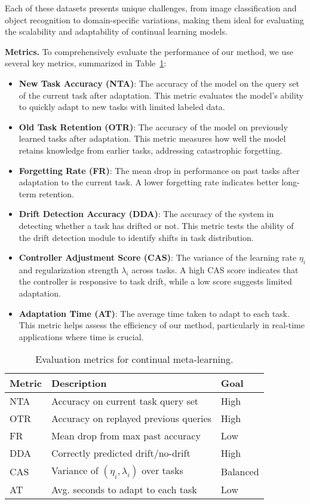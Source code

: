 \documentclass[conference]{IEEEtran}
\begin{document}
Each of these datasets presents unique challenges, from image classification and object recognition to domain-specific variations, making them ideal for evaluating the scalability and adaptability of continual learning models.

\textbf{Metrics.}  
To comprehensively evaluate the performance of our method, we use several key metrics, summarized in Table~\ref{tab:evaluation_matrix}:

\begin{itemize}
    \item \textbf{New Task Accuracy (NTA)}: The accuracy of the model on the query set of the current task after adaptation. This metric evaluates the model's ability to quickly adapt to new tasks with limited labeled data.
    \item \textbf{Old Task Retention (OTR)}: The accuracy of the model on previously learned tasks after adaptation. This metric measures how well the model retains knowledge from earlier tasks, addressing catastrophic forgetting.
    \item \textbf{Forgetting Rate (FR)}: The mean drop in performance on past tasks after adaptation to the current task. A lower forgetting rate indicates better long-term retention.
    \item \textbf{Drift Detection Accuracy (DDA)}: The accuracy of the system in detecting whether a task has drifted or not. This metric tests the ability of the drift detection module to identify shifts in task distribution.
    \item \textbf{Controller Adjustment Score (CAS)}: The variance of the learning rate $\eta_i$ and regularization strength $\lambda_i$ across tasks. A high CAS score indicates that the controller is responsive to task drift, while a low score suggests limited adaptation.
    \item \textbf{Adaptation Time (AT)}: The average time taken to adapt to each task. This metric helps assess the efficiency of our method, particularly in real-time applications where time is crucial.
\end{itemize}

\begin{table}[ht]
\centering
\caption{Evaluation metrics for continual meta-learning.}
\begin{tabular}{@{}p{2.8cm} p{3.7cm} p{1.2cm}@{}}
\toprule
\textbf{Metric} & \textbf{Description} & \textbf{Goal} \\
\midrule
NTA & Accuracy on current task query set & High \\
OTR & Accuracy on replayed previous queries & High \\
FR & Mean drop from max past accuracy & Low \\
DDA & Correctly predicted drift/no-drift & High \\
CAS & Variance of $(\eta_i, \lambda_i)$ over tasks & Balanced \\
AT & Avg. seconds to adapt to each task & Low \\
\bottomrule
\end{tabular}
\label{tab:evaluation_matrix}
\end{table}
\end{document}
